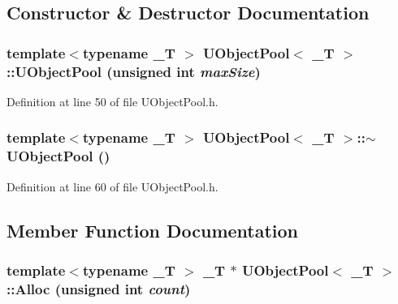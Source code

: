 \subsection{Constructor \& Destructor Documentation}
\hypertarget{class_u_object_pool_bfb3ded5de6f776873e89fb45b6eb3af}{
\subsubsection[{UObjectPool}]{\setlength{\rightskip}{0pt plus 5cm}template$<$typename \_\-T $>$ {\bf UObjectPool}$<$ \_\-T $>$::{\bf UObjectPool} (unsigned int {\em maxSize})}}
\label{class_u_object_pool_bfb3ded5de6f776873e89fb45b6eb3af}




Definition at line 50 of file UObjectPool.h.\hypertarget{class_u_object_pool_d7d7c446edb058e7af78972484cfcb0e}{
\subsubsection[{$\sim$UObjectPool}]{\setlength{\rightskip}{0pt plus 5cm}template$<$typename \_\-T $>$ {\bf UObjectPool}$<$ \_\-T $>$::$\sim${\bf UObjectPool} ()}}
\label{class_u_object_pool_d7d7c446edb058e7af78972484cfcb0e}




Definition at line 60 of file UObjectPool.h.

\subsection{Member Function Documentation}
\hypertarget{class_u_object_pool_b86f0a98406e5ee01a521a8cb9a08dff}{
\subsubsection[{Alloc}]{\setlength{\rightskip}{0pt plus 5cm}template$<$typename \_\-T $>$ \_\-T $\ast$ {\bf UObjectPool}$<$ \_\-T $>$::Alloc (unsigned int {\em count})}}
\label{class_u_object_pool_b86f0a98406e5ee01a521a8cb9a08dff}





